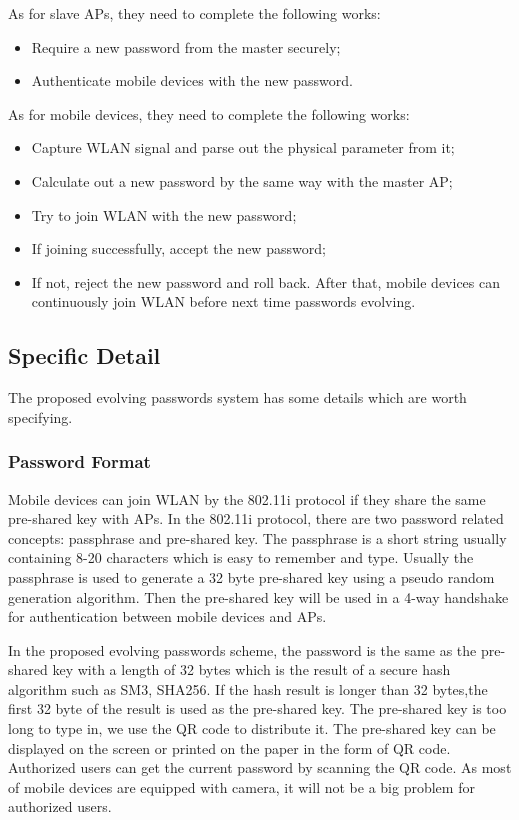 As for slave APs, they need to complete the following works: 
\begin{itemize}
    \item Require a new password from the master securely; 
    \item Authenticate mobile devices with the new password. 
\end{itemize}
	
As for mobile devices, they need to complete the following works: 
\begin{itemize}
    \item Capture WLAN signal and parse out the physical parameter from it; 
    \item Calculate out a new password by the same way with the master AP; 
    \item Try to join WLAN with the new password; 
    \item If joining successfully, accept the new password;
    \item If not, reject the new password and roll back.  After that, mobile devices can continuously join WLAN before next time passwords evolving. 
\end{itemize}

\subsection{Specific Detail}
The proposed evolving passwords system has some details which are worth specifying. 

\subsubsection{Password Format}
Mobile devices can join WLAN by the 802.11i protocol if they share the same pre-shared key with APs. In the 802.11i protocol, there are two password related concepts: passphrase and pre-shared key. The passphrase is a short string usually containing 8-20 characters which is easy to remember and type. Usually the passphrase is used to generate a 32 byte pre-shared key using a pseudo random generation algorithm. Then the pre-shared key will be used in a 4-way handshake for authentication between mobile devices and APs. 


In the proposed evolving passwords scheme, the password is the same as the pre-shared key with a length of 32 bytes which is the result of a secure hash algorithm such as SM3, SHA256. If the hash result is longer than 32 bytes,the first 32 byte of the result is used as the pre-shared key. The pre-shared key is too long to type in, we use the QR code to distribute it. The pre-shared key can be displayed on the screen or printed on the paper in the form of QR code. Authorized users can get the current password by scanning the QR code. As most of mobile devices are equipped with camera, it will not be a big problem for authorized users. 

